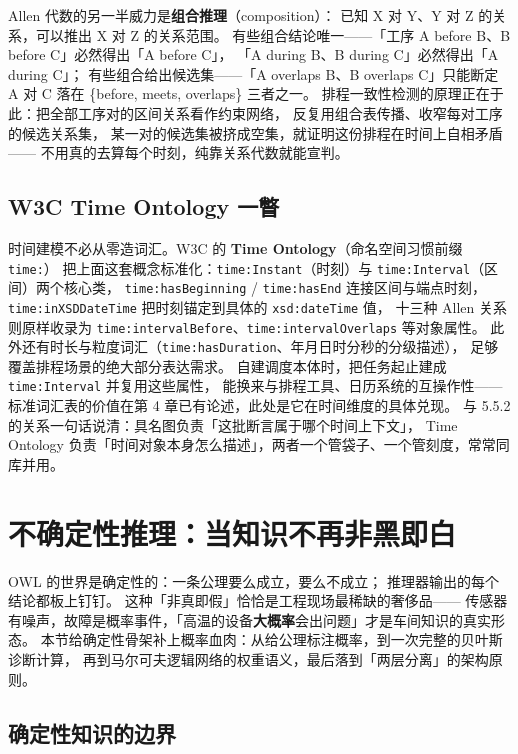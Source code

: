 Allen 代数的另一半威力是\textbf{组合推理}（composition）：
已知 X 对 Y、Y 对 Z 的关系，可以推出 X 对 Z 的关系范围。
有些组合结论唯一——「工序 A before B、B before C」必然得出「A before C」，
「A during B、B during C」必然得出「A during C」；
有些组合给出候选集——「A overlaps B、B overlaps C」只能断定
A 对 C 落在 \{before, meets, overlaps\} 三者之一。
排程一致性检测的原理正在于此：把全部工序对的区间关系看作约束网络，
反复用组合表传播、收窄每对工序的候选关系集，
某一对的候选集被挤成空集，就证明这份排程在时间上自相矛盾——
不用真的去算每个时刻，纯靠关系代数就能宣判。

\subsection{W3C Time Ontology 一瞥}

时间建模不必从零造词汇。W3C 的 \textbf{Time Ontology}（命名空间习惯前缀 \texttt{time:}）
把上面这套概念标准化：\texttt{time:Instant}（时刻）与 \texttt{time:Interval}（区间）两个核心类，
\texttt{time:hasBeginning} / \texttt{time:hasEnd} 连接区间与端点时刻，
\texttt{time:inXSDDateTime} 把时刻锚定到具体的 \texttt{xsd:dateTime} 值，
十三种 Allen 关系则原样收录为 \texttt{time:intervalBefore}、\texttt{time:intervalOverlaps}
等对象属性。
此外还有时长与粒度词汇（\texttt{time:hasDuration}、年月日时分秒的分级描述），
足够覆盖排程场景的绝大部分表达需求。
自建调度本体时，把任务起止建成 \texttt{time:Interval} 并复用这些属性，
能换来与排程工具、日历系统的互操作性——标准词汇表的价值在第 4 章已有论述，此处是它在时间维度的具体兑现。
与 5.5.2 的关系一句话说清：具名图负责「这批断言属于哪个时间上下文」，
Time Ontology 负责「时间对象本身怎么描述」，两者一个管袋子、一个管刻度，常常同库并用。

\section{不确定性推理：当知识不再非黑即白}

OWL 的世界是确定性的：一条公理要么成立，要么不成立；
推理器输出的每个结论都板上钉钉。
这种「非真即假」恰恰是工程现场最稀缺的奢侈品——
传感器有噪声，故障是概率事件，「高温的设备\textbf{大概率}会出问题」才是车间知识的真实形态。
本节给确定性骨架补上概率血肉：从给公理标注概率，到一次完整的贝叶斯诊断计算，
再到马尔可夫逻辑网络的权重语义，最后落到「两层分离」的架构原则。

\subsection{确定性知识的边界}

